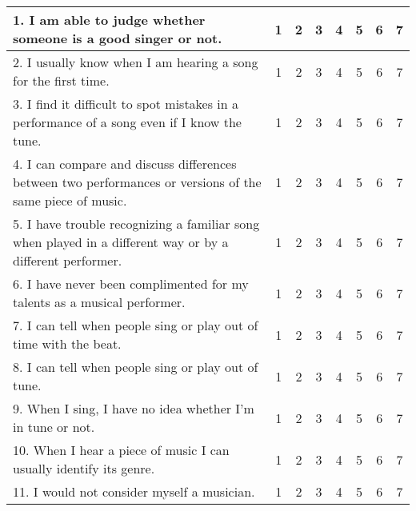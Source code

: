 \documentclass[12pt, a4paper]{article}
\begin{document}
\vspace{8pt}

\begin{tabular}{|m{10cm}|c|c|c|c|c|c|c|}
\hline
1. I am able to judge whether someone is a good singer or not. & 1 & 2 & 3 & 4 & 5 & 6 & 7 \\ \hline
2. I usually know when I am hearing a song for the first time. & 1 & 2 & 3 & 4 & 5 & 6 & 7 \\ \hline
3. I find it difficult to spot mistakes in a performance of a song even if I know the tune. & 1 & 2 & 3 & 4 & 5 & 6 & 7 \\ \hline
4. I can compare and discuss differences between two performances or versions of the same piece of music. & 1 & 2 & 3 & 4 & 5 & 6 & 7 \\ \hline
5. I have trouble recognizing a familiar song when played in a different way or by a different performer. & 1 & 2 & 3 & 4 & 5 & 6 & 7 \\ \hline
6. I have never been complimented for my talents as a musical performer. & 1 & 2 & 3 & 4 & 5 & 6 & 7 \\ \hline
7. I can tell when people sing or play out of time with the beat. & 1 & 2 & 3 & 4 & 5 & 6 & 7 \\ \hline
8. I can tell when people sing or play out of tune. & 1 & 2 & 3 & 4 & 5 & 6 & 7 \\[5pt] \hline
9. When I sing, I have no idea whether I'm in tune or not. & 1 & 2 & 3 & 4 & 5 & 6 & 7 \\ \hline
10. When I hear a piece of music I can usually identify its genre. & 1 & 2 & 3 & 4 & 5 & 6 & 7 \\ \hline
11. I would not consider myself a musician. & 1 & 2 & 3 & 4 & 5 & 6 & 7 \\[5pt] \hline
\end{tabular}

\vspace{10pt}
\end{document}
